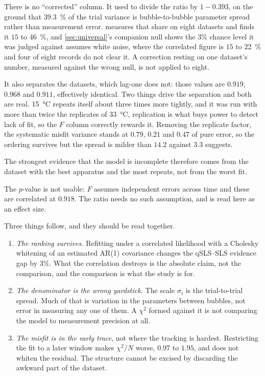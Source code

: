 \documentclass[10pt]{article}
\begin{document}
There is no ``corrected'' column. It used to divide the ratio by $1 - 0.393$, on the ground that
\SI{39.3}{\percent} of the trial variance is bubble-to-bubble parameter spread rather than
measurement error.  measures that share on eight datasets and finds it $15$ to
\SI{46}{\percent}, and \cref{sec:universal}'s companion null shows the $3\%$ chance level it was
judged against assumes white noise, where the correlated figure is $15$ to \SI{22}{\percent} and
four of eight records do not clear it. A correction resting on one dataset's number, measured
against the wrong null, is not applied to eight.

It also separates the datasets, which lag-one does not: those values are $0.919$, $0.968$ and
$0.911$, effectively identical. Two things drive the separation and both are real.
\SI{15}{\celsius} repeats itself about three times more tightly, and it was run with more than
twice the replicates of \SI{33}{\celsius}, replication is what buys power to detect lack of
fit, so the $F$ column correctly rewards it. Removing the replicate factor, the systematic
misfit variance stands at $0.79$, $0.21$ and $0.47$ of pure error, so the ordering survives but
the spread is milder than $14.2$ against $3.3$ suggests.

The strongest evidence that the model is incomplete therefore comes from the dataset with the
best apparatus and the most repeats, not from the worst fit.

The $p$-value is not usable: $F$ assumes independent errors across time and these are
correlated at $0.918$. The ratio needs no such assumption, and is read here as an effect size.

Three things follow, and they should be read together.

\begin{enumerate}
\item \emph{The ranking survives.} Refitting under a correlated likelihood with a Cholesky
whitening of an estimated AR(1) covariance changes the qSLS--SLS evidence gap by $3\%$. What
the correlation destroys is the absolute claim, not the comparison, and the comparison is
what the study is for.
\item \emph{The denominator is the wrong yardstick.} The scale $\sigma_i$ is the
trial-to-trial spread. Much of that is variation in the parameters between bubbles, not error
in measuring any one of them. A $\chi^2$ formed against it is not comparing the model to
measurement precision at all.
\item \emph{The misfit is in the early trace}, not where the tracking is hardest.
Restricting the fit to a later window makes $\chi^2/N$ worse, $0.97$ to $1.95$, and does not
whiten the residual. The structure cannot be excised by discarding the awkward part of the
dataset.
\end{enumerate}
\end{document}
